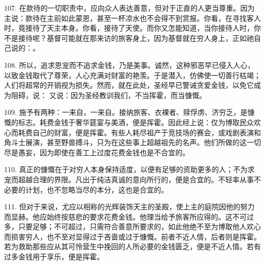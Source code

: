 107. 在款待的一切职责中，应向众人表达善意，但对于正直的人更当尊重。因为主说：款待在主前如此蒙恩，甚至一杯凉水也不会得不到赏报。你看，在寻找客人时，竟接待了天主本身。你看，接待了天使。而你又怎能知道，当你接待人时，你不是接待呢？基督可能就在那来访的旅客身上，因为基督就在穷人身上，正如祂自己说的：。\par

108. 所以，追求恩宠而不追求金钱，乃是美事。诚然，这种邪恶早已侵入人心，以致金钱取代了尊荣，人心充满对财富的艳羡。于是潜入，仿佛使一切善行枯竭；人们将超常的开销视为损失。然而，就在此处，圣经早已警诫贪爱金钱，以免它成为阻碍，说： 又说：因为圣经教训我们，不当挥霍，而当慷慨。\par

109. 施予有两种：一来自，一来自。接纳旅客、衣裸者、赎俘虏、济穷乏，是慷慨的标志。耗费金钱于奢华筵宴与美酒，便是挥霍。因此经上说：仅为博取民众欢心而耗费自己的财富，便是挥霍。有些人耗尽祖产于竞技场的赛会，或戏剧表演和角斗士展演，甚至野兽搏斗，只为在这些事上超越祖先的名声。他们所做的这一切尽是愚妄，因为即使在善工上过度花费金钱也是不合宜的。\par

110. 真正的慷慨在于对穷人本身保持适度，以便有足够的资助更多的人；不为求宠而超越合理的界限。凡出于纯洁真诚的意向所行的，便是合宜的。不轻率从事不必要的计划，也不忽略当尽的本分，这也是合宜的。\par

111. 但对于来说，尤应以相称的光辉装饰天主的圣殿，使上主的庭院因他的努力而显赫。他应始终按慈悲的要求花费金钱。他理当给予旅客所应得的。这不可过多，只要足够；不可超过，只需符合善意所要求的，如此他绝不至为博取他人欢心而损害穷人，也不至对显得过于吝啬或过于慷慨。前者不近人情，后者则是挥霍。若为救助那些应从其可怜营生中挽回的人所必要的金钱匮乏，便是不近人情。若有过多金钱用于享乐，便是挥霍。\par


